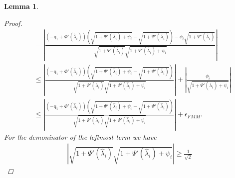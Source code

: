 \documentclass{article}
\newcommand{\labs}{\left|}
\newcommand{\rabs}{\right|}
\newcommand{\lpar}{\left(}
\newcommand{\rpar}{\right)}
\newtheorem{lemma}{Lemma}[section]
\newcommand\vecq{\boldsymbol{\mathrm{q}}}
\begin{document}
\begin{lemma}
\begin{proof}
\begin{align}
            &=
            \labs
                \frac{
                    \lpar
                        -\vecq_1
                        +
                        \Phi'(\widehat\lambda_i)
                    \rpar
                    \lpar
                        \sqrt{1+\Psi'(\widehat\lambda_i)+\psi_i}
                        -
                        \sqrt{1+\Psi'(\widehat\lambda_i)}
                    \rpar
                    -
                    \phi_i
                    \sqrt{1+\Psi'(\widehat\lambda_i)}
                }{
                    \sqrt{1+\Psi'(\widehat\lambda_i)}\sqrt{1+\Psi'(\widehat\lambda_i)+\psi_i}
                }
            \rabs
            \nonumber
            \\
            &\leq
            \labs
                \frac{
                    \lpar
                        -\vecq_1
                        +
                        \Phi'(\widehat\lambda_i)
                    \rpar
                    \lpar
                        \sqrt{1+\Psi'(\widehat\lambda_i)+\psi_i}
                        -
                        \sqrt{1+\Psi'(\widehat\lambda_i)}
                    \rpar
                }{
                    \sqrt{1+\Psi'(\widehat\lambda_i)}\sqrt{1+\Psi'(\widehat\lambda_i)+\psi_i}
                }
            \rabs
            +
            \labs
                \frac{
                    \phi_i
                }{
                    \sqrt{1+\Psi'(\widehat\lambda_i)+\psi_i}
                }
            \rabs
            \nonumber
            \\
            &\leq
            \labs
                \frac{
                    \lpar
                        -\vecq_1
                        +
                        \Phi'(\widehat\lambda_i)
                    \rpar
                    \lpar
                        \sqrt{1+\Psi'(\widehat\lambda_i)+\psi_i}
                        -
                        \sqrt{1+\Psi'(\widehat\lambda_i)}
                    \rpar
                }{
                    \sqrt{1+\Psi'(\widehat\lambda_i)}\sqrt{1+\Psi'(\widehat\lambda_i)+\psi_i}
                }
            \rabs
            +
            \epsilon_{FMM}.
            \label{eq:fmm_approximate_inner_product_6}
        \end{align}
        \endgroup
        For the demoninator of the leftmost term we have
        \begin{align}
            \labs
                \sqrt{1+\Psi'(\widehat\lambda_i)}\sqrt{1+\Psi'(\widehat\lambda_i)+\psi_i}
            \rabs
            \geq
            \frac{1}{\sqrt{2}}

\end{align}
\end{proof}
\end{lemma}
\end{document}
